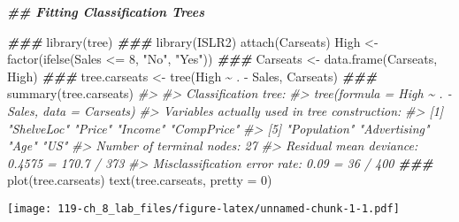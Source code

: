 \documentclass[
]{book}
\newenvironment{Shaded}{\begin{snugshade}}{\end{snugshade}}
\newcommand{\AttributeTok}[1]{\textcolor[rgb]{0.77,0.63,0.00}{#1}}
\newcommand{\CommentTok}[1]{\textcolor[rgb]{0.56,0.35,0.01}{\textit{#1}}}
\newcommand{\DecValTok}[1]{\textcolor[rgb]{0.00,0.00,0.81}{#1}}
\newcommand{\DocumentationTok}[1]{\textcolor[rgb]{0.56,0.35,0.01}{\textbf{\textit{#1}}}}
\newcommand{\FunctionTok}[1]{\textcolor[rgb]{0.00,0.00,0.00}{#1}}
\newcommand{\NormalTok}[1]{#1}
\newcommand{\OtherTok}[1]{\textcolor[rgb]{0.56,0.35,0.01}{#1}}
\newcommand{\SpecialCharTok}[1]{\textcolor[rgb]{0.00,0.00,0.00}{#1}}
\newcommand{\StringTok}[1]{\textcolor[rgb]{0.31,0.60,0.02}{#1}}
\begin{document}
\begin{Shaded}
\begin{Highlighting}[]

\DocumentationTok{\#\# Fitting Classification Trees}

\DocumentationTok{\#\#\#}
\FunctionTok{library}\NormalTok{(tree)}
\DocumentationTok{\#\#\#}
\FunctionTok{library}\NormalTok{(ISLR2)}
\FunctionTok{attach}\NormalTok{(Carseats)}
\NormalTok{High }\OtherTok{\textless{}{-}} \FunctionTok{factor}\NormalTok{(}\FunctionTok{ifelse}\NormalTok{(Sales }\SpecialCharTok{\textless{}=} \DecValTok{8}\NormalTok{, }\StringTok{"No"}\NormalTok{, }\StringTok{"Yes"}\NormalTok{))}
\DocumentationTok{\#\#\#}
\NormalTok{Carseats }\OtherTok{\textless{}{-}} \FunctionTok{data.frame}\NormalTok{(Carseats, High)}
\DocumentationTok{\#\#\#}
\NormalTok{tree.carseats }\OtherTok{\textless{}{-}} \FunctionTok{tree}\NormalTok{(High }\SpecialCharTok{\textasciitilde{}}\NormalTok{ . }\SpecialCharTok{{-}}\NormalTok{ Sales, Carseats)}
\DocumentationTok{\#\#\#}
\FunctionTok{summary}\NormalTok{(tree.carseats)}
\CommentTok{\#\textgreater{} }
\CommentTok{\#\textgreater{} Classification tree:}
\CommentTok{\#\textgreater{} tree(formula = High \textasciitilde{} . {-} Sales, data = Carseats)}
\CommentTok{\#\textgreater{} Variables actually used in tree construction:}
\CommentTok{\#\textgreater{} [1] "ShelveLoc"   "Price"       "Income"      "CompPrice"  }
\CommentTok{\#\textgreater{} [5] "Population"  "Advertising" "Age"         "US"         }
\CommentTok{\#\textgreater{} Number of terminal nodes:  27 }
\CommentTok{\#\textgreater{} Residual mean deviance:  0.4575 = 170.7 / 373 }
\CommentTok{\#\textgreater{} Misclassification error rate: 0.09 = 36 / 400}
\DocumentationTok{\#\#\#}
\FunctionTok{plot}\NormalTok{(tree.carseats)}
\FunctionTok{text}\NormalTok{(tree.carseats, }\AttributeTok{pretty =} \DecValTok{0}\NormalTok{)}
\end{Highlighting}
\end{Shaded}

\texttt{[image: 119-ch\_8\_lab\_files/figure-latex/unnamed-chunk-1-1.pdf]}
\end{document}
